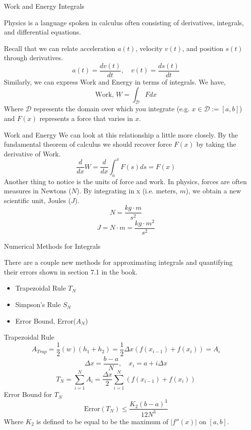 \documentclass{beamer}
\begin{document}
\begin{frame}{Work and Energy Integrals}

Physics is a language spoken in calculus often consisting of derivatives, integrals, and differential equations. 

Recall that we can relate acceleration $a(t)$, velocity $v(t)$, and position $s(t)$ through derivatives. 
\[
    a(t) = \frac{d v(t)}{dt}, \quad v(t) = \frac{d s(t)}{dt}
\]
Similarly, we can express Work and Energy in terms of integrals. We have, 
\[
    \text{Work, } W = \int_{\mathcal{D}} F dx
\]
Where $\mathcal{D}$ represents the domain over which you integrate (e.g. $x \in \mathcal{D} := [a, b]$) and $F(x)$ represents a force that varies in $x$. 
\end{frame}
\begin{frame}{Work and Energy}
    We can look at this relationship a little more closely. By the fundamental theorem of calculus we should recover force $F(x)$ by taking the derivative of Work. 
    \[
        \frac{d}{dx} W = \frac{d}{dx} \int_a^x F(s)ds = F(x) 
    \]
    Another thing to notice is the units of force and work. In physics, forces are often measures in Newtons ($N$). By integrating in x (i.e. meters, $m$), we obtain a new scientific unit, Joules ($J$). 
    \[
        N = \frac{kg \cdot m }{s^2}
    \]  
    \[
        J = N \cdot m = \frac{kg \cdot m^2}{s^2}
    \]
\end{frame}

\begin{frame}{Numerical Methods for Integrals}

    There are a couple new methods for approximating integrals and quantifying their errors shown in section 7.1 in the book.
    \begin{itemize}
        \item Trapezoidal Rule $T_N$
        \item Simpson's Rule $S_N$
        \item Error Bound, Error($A_N$)
    \end{itemize}
\end{frame}

\begin{frame}{Trapezoidal Rule}
    \[
        A_{Trap} = \frac{1}{2}(w)(h_1 + h_2) = \frac{1}{2}\Delta x (f(x_{i-1}) + f(x_i)) = A_i
    \]
    \[
        \Delta x = \frac{b - a}{N}, \quad x_i = a + i \Delta x 
    \]
    \[
        T_N = \sum_{i=1}^N A_i = \frac{\Delta x}{2}\sum_{i=1}^N (f(x_{i-1}) + f(x_i))
    \]  
    Error Bound for $T_N$
    \[
        \text{Error}(T_N) \le \frac{K_2(b-a)^3}{12N^3}
    \]
    Where $K_2$ is defined to be equal to be the maximum of $|f''(x)|$ on $[a, b]$. 
\end{frame}
\end{document}
